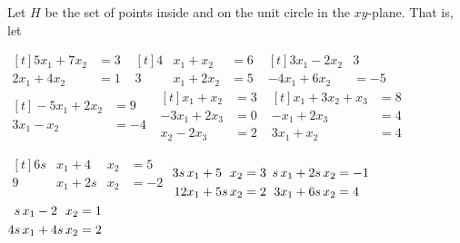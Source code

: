 \documentclass[11pt,answers]{exam} %
\begin{document}
\begin{questions}
\begin{parts}
    \question Let $H$ be the set of points inside and on the unit circle in the $xy$-plane. That is, let 
    \end{parts}
    $
        \begin{aligned}[t]
            5x_1+7x_2 &= 3 \\
            2x_1 + 4x_2 &= 1
        \end{aligned}
    $
    \question
        $
        \begin{aligned}[t]
            4&x_1 + x_2 &= 6 \\
            3&x_1 + 2x_2 &= 5
        \end{aligned}
    $
        \question
        $
        \begin{aligned}[t]
            3x_1 - 2x_2 & 3 \\
            -4 x_1 + 6x_2 &= -5
        \end{aligned}
    $
        \question
        $
        \begin{aligned}[t]
            -5x_1 + 2x_2 &=9 \\
            3x_1 - x_2 &= -4
        \end{aligned}
    $
        \question
        $
        \begin{aligned}[t]
            x_1 + x_2 &= 3 \\
            -3x_1 + 2x_3 &= 0 \\
            x_2 - 2x_3 &= 2 
        \end{aligned}
    $
        \question
        $
        \begin{aligned}[t]
            x_1+3x_2+x_3&=8 \\
            -x_1 + 2x_3 &=4 \\
            3x_1 + x_2 &= 4
        \end{aligned}
    $

    \question
        $
        \begin{aligned}[t]
            6s &x_1 + 4 &x_2 &= 5 \\
            9 &x_1 + 2s &x_2 &= -2  
        \end{aligned}
        $
    \question 
        $
        \begin{alignedat}[t]{3}
            3s \, &x_1 + 5 &x_2 &= 3 \\
            12 &x_1 + 5s \, &x_2 &= 2
        \end{alignedat}
        $
    \question 
        $
        \begin{alignedat}[t]{3}
            s\, &x_1 + 2s \, &x_2 &= -1 \\
            3 &x_1 + 6s \, &x_2 &= 4
        \end{alignedat}
        $
    \question 
        $
        \begin{alignedat}[t]{3}
            s \, &x_1 - 2 &x_2 &= 1 \\
            4s \, &x_1 +4s\, &x_2 &= 2
        \end{alignedat}
        $
    

\end{questions}
\end{document}
